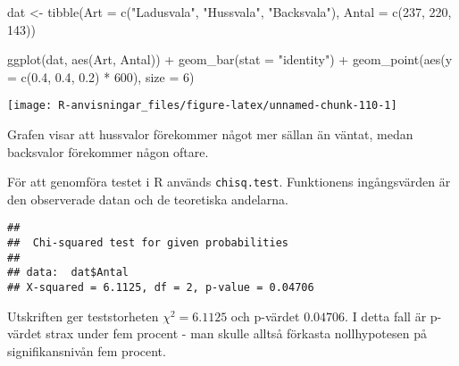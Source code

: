 \documentclass[
]{book}
\newenvironment{Shaded}{\begin{snugshade}}{\end{snugshade}}
\newcommand{\AttributeTok}[1]{\textcolor[rgb]{0.77,0.63,0.00}{#1}}
\newcommand{\DecValTok}[1]{\textcolor[rgb]{0.00,0.00,0.81}{#1}}
\newcommand{\FloatTok}[1]{\textcolor[rgb]{0.00,0.00,0.81}{#1}}
\newcommand{\FunctionTok}[1]{\textcolor[rgb]{0.00,0.00,0.00}{#1}}
\newcommand{\NormalTok}[1]{#1}
\newcommand{\OtherTok}[1]{\textcolor[rgb]{0.56,0.35,0.01}{#1}}
\newcommand{\SpecialCharTok}[1]{\textcolor[rgb]{0.00,0.00,0.00}{#1}}
\newcommand{\StringTok}[1]{\textcolor[rgb]{0.31,0.60,0.02}{#1}}
\theoremstyle{definition}
\theoremstyle{definition}
\theoremstyle{definition}
\theoremstyle{definition}
\theoremstyle{remark}
\begin{document}
\begin{Shaded}
\begin{Highlighting}[]
\NormalTok{dat }\OtherTok{\textless{}{-}} \FunctionTok{tibble}\NormalTok{(}\AttributeTok{Art =} \FunctionTok{c}\NormalTok{(}\StringTok{"Ladusvala"}\NormalTok{, }\StringTok{"Hussvala"}\NormalTok{, }\StringTok{"Backsvala"}\NormalTok{),}
              \AttributeTok{Antal =} \FunctionTok{c}\NormalTok{(}\DecValTok{237}\NormalTok{, }\DecValTok{220}\NormalTok{, }\DecValTok{143}\NormalTok{))}

\FunctionTok{ggplot}\NormalTok{(dat, }\FunctionTok{aes}\NormalTok{(Art, Antal)) }\SpecialCharTok{+}
  \FunctionTok{geom\_bar}\NormalTok{(}\AttributeTok{stat =} \StringTok{"identity"}\NormalTok{) }\SpecialCharTok{+}
  \FunctionTok{geom\_point}\NormalTok{(}\FunctionTok{aes}\NormalTok{(}\AttributeTok{y =} \FunctionTok{c}\NormalTok{(}\FloatTok{0.4}\NormalTok{, }\FloatTok{0.4}\NormalTok{, }\FloatTok{0.2}\NormalTok{) }\SpecialCharTok{*} \DecValTok{600}\NormalTok{), }\AttributeTok{size =} \DecValTok{6}\NormalTok{)}
\end{Highlighting}
\end{Shaded}

\begin{center}\texttt{[image: R-anvisningar\_files/figure-latex/unnamed-chunk-110-1]} \end{center}

Grafen visar att hussvalor förekommer något mer sällan än väntat, medan backsvalor förekommer någon oftare.

För att genomföra testet i R används \texttt{chisq.test}. Funktionens ingångsvärden är den observerade datan och de teoretiska andelarna.

\begin{Shaded}
\end{Shaded}

\begin{verbatim}
## 
##  Chi-squared test for given probabilities
## 
## data:  dat$Antal
## X-squared = 6.1125, df = 2, p-value = 0.04706
\end{verbatim}

Utskriften ger teststorheten \(\chi^2 = 6.1125\) och p-värdet \(0.04706\). I detta fall är p-värdet strax under fem procent - man skulle alltså förkasta nollhypotesen på signifikansnivån fem procent.
\end{document}
